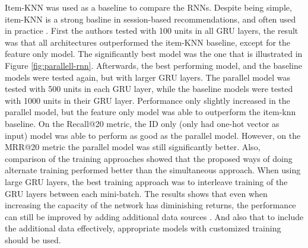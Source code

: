 Item-KNN was used as a baseline to compare the RNNs. Despite being simple, item-KNN is a strong basline in session-based recommendations, and often used in practice \cite{Hidasi:2016:PRN:2959100.2959167}. First the authors tested with 100 units in all GRU layers, the result was that all architectures outperformed the item-KNN baseline, except for the feature only model. The significantly best model was the one that is illustrated in Figure \ref{fig:parallell-rnn}. Afterwards, the best performing model, and the baseline models were tested again, but with larger GRU layers. The parallel model was tested with 500 units in each GRU layer, while the baseline models were tested with 1000 units in their GRU layer. Performance only slightly increased in the parallel model, but the feature only model was able to outperform the item-knn baseline. On the Recall@20 metric, the ID only (only had one-hot vector as input) model was able to perform as good as the parallel model. However, on the MRR@20 metric the parallel model was still significantly better. Also, comparison of the training approaches showed that the proposed ways of doing alternate training performed better than the simultaneous approach. When using large GRU layers, the best training approach was to interleave training of the GRU layers between each mini-batch. The results shows that even when increasing the capacity of the network has diminishing returns, the performance can still be improved by adding additional data sources \cite{Hidasi:2016:PRN:2959100.2959167}. And also that to include the additional data effectively, appropriate models with customized training should be used.





